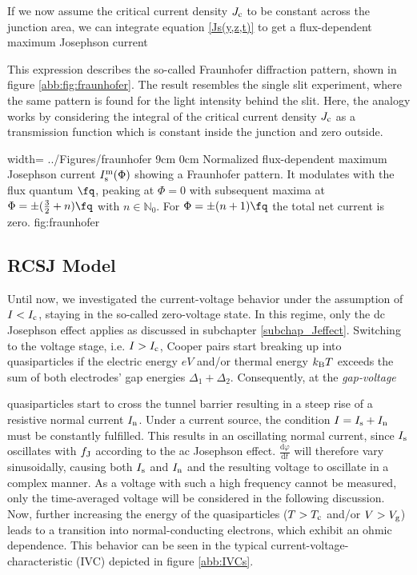 If we now assume the critical current density $J_{\rm c}$ to be constant across the junction area, we can integrate equation \ref{Js(y,z,t)} to get a flux-dependent maximum Josephson current


This expression describes the so-called Fraunhofer diffraction pattern, shown in figure \ref{abb:fig:fraunhofer}. The result resembles the single slit experiment, where the same pattern is found for the light intensity behind the slit. Here, the analogy works by considering the integral of the critical current density $J_{\rm c}$ as a transmission function which is constant inside the junction and zero outside. 

{width=\textwidth}
{../Figures/fraunhofer}
{9cm}
{0cm}
{Normalized flux-dependent maximum Josephson current $I_{\rm s}^{\rm m}(\Phi)$ showing a Fraunhofer pattern. It modulates with the flux quantum $\unit{\fq}$, peaking at $\Phi=0$ with subsequent maxima at $\Phi=\pm(\frac{3}{2}+n)\unit{\fq}$ with $n\in\mathbb{N}_0$. For $\Phi=\pm(n+1)\unit{\fq}$ the total net current is zero.} 
{fig:fraunhofer}


\subsection{RCSJ Model}

Until now, we investigated the current-voltage behavior under the assumption of $I<I_{\rm c}$, staying in the so-called zero-voltage state. In this regime, only the dc Josephson effect applies as discussed in subchapter \ref{subchap_Jeffect}. Switching to the voltage stage, i.e. $I>I_{\rm c}$, Cooper pairs start breaking up into quasiparticles if the electric energy $eV$ and/or thermal energy $k_{\rm B}T$ exceeds the sum of both electrodes' gap energies $\Delta_1 + \Delta_2$. Consequently, at the \textit{gap-voltage} 


quasiparticles start to cross the tunnel barrier resulting in a steep rise of a resistive normal current $I_{\rm n}$. Under a current source, the condition $I=I_{\rm s}+I_{\rm n}$ must be constantly fulfilled. This results in an oscillating normal current, since $I_{\rm s}$ oscillates with $f_{\rm J}$ according to the ac Josephson effect. $\frac{\mathrm{d}\varphi}{\mathrm{d}t}$ will therefore vary sinusoidally, causing both $I_{\rm s}$ and $I_{\rm n}$ and the resulting voltage to oscillate in a complex manner. As a voltage with such a high frequency cannot be measured, only the time-averaged voltage will be considered in the following discussion. \\
Now, further increasing the energy of the quasiparticles ($T>T_{\rm c}$ and/or $V>V_{\rm g}$) leads to a transition into normal-conducting electrons, which exhibit an ohmic dependence. This behavior can be seen in the typical current-voltage-characteristic (IVC) depicted in figure \ref{abb:IVCs}. \\ 


